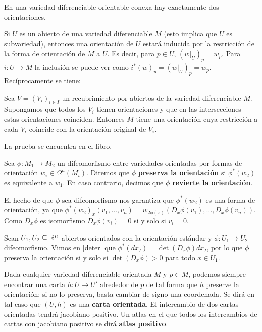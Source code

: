 \documentclass[CV.tex]{subfiles}
\begin{document}
\begin{lemma}
En una variedad diferenciable orientable conexa hay exactamente dos orientaciones.
\end{lemma}

Si $U$ es un abierto de una variedad diferenciable $M$ (esto implica que $U$ es subvariedad), entonces una orientación de $U$ estará inducida por la restricción de la forma de orientación de $M$ a $U$. Es decir, para $p\in U$, $(w|_{U})_p=w_p$. Para $i:U\to M$ la inclusión se puede ver como $i^*(w)_p=(w|_{U})_p=w_p$. Recíprocamente se tiene:

\begin{lemma}\label{vi}
Sea $V=(V_i)_{i\in I}$ un recubrimiento por abiertos de la variedad diferenciable $M$. Supongamos que todos los $V_i$ tienen orientaciones y que en las intersecciones estas orientaciones coinciden. Entonces $M$ tiene una orientación cuya restricción a cada $V_i$ coincide con la orientación original de $V_i$. 
\end{lemma}
La prueba se encuentra en el libro.

\begin{defi}
Sea $\phi:M_1\to M_2$ un difeomorfismo entre variedades orientadas por formas de orientación $w_i\in\Omega^n(M_i)$. Diremos que $\phi$ \textbf{preserva la orientación} si $\phi^*(w_2)$ es equivalente a $w_1$. En caso contrario, decimos que $\phi$  \textbf{revierte la orientación}.
\end{defi}

\begin{nota}
El hecho de que $\phi$ sea difeomorfismo nos garantiza que $\phi^*(w_2)$ es una forma de orientación, ya que $\phi^*(w_2)_x(v_1,\dots, v_n)=w_{2\phi(x)}(D_x\phi(v_1),\dots, D_x\phi(v_n))$. Como $D_x\phi$ es isomorfismo $D_x\phi(v_i)=0$ si y solo si $v_i=0$. 
\end{nota}

\begin{ej}
Sean $U_1,U_2\subseteq\mathbb{R}^n$ abiertos orientados con la orientación estándar y $\phi:U_1\to U_2$ difeomorfismo. Vimos en \ref{deter} que $\phi^*(dx_I)=\det(D_x\phi)dx_I$, por lo que $\phi$ preserva la orientación si y solo si $\det(D_x\phi)>0$ para todo $x\in U_1$. 
\end{ej}

Dada cualquier variedad diferenciable orientada $M$ y $p\in M$, podemos siempre encontrar una carta $h:U\to U'$ alrededor de $p$ de tal forma que $h$ preserve la orientación: si no lo preserva, basta cambiar de signo una coordenada. Se dirá en tal caso que $(U,h)$ es una \textbf{carta orientada}. El intercambio de dos cartas orientadas tendrá jacobiano positivo. Un atlas en el que todos los intercambios de cartas con jacobiano positivo se dirá \textbf{atlas positivo}.
\end{document}

